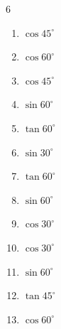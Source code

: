 \begin{multicols}{6}
\begin{enumerate}
  \item $\displaystyle \cos{45^\circ}$


  \item $\displaystyle \cos{60^\circ}$


  \item $\displaystyle \cos{45^\circ}$


  \item $\displaystyle \sin{60^\circ}$


  \item $\displaystyle \tan{60^\circ}$


  \item $\displaystyle \sin{30^\circ}$


  \item $\displaystyle \tan{60^\circ}$


  \item $\displaystyle \sin{60^\circ}$


  \item $\displaystyle \cos{30^\circ}$


\columnbreak %

  \item $\displaystyle \cos{30^\circ}$


  \item $\displaystyle \sin{60^\circ}$


  \item $\displaystyle \tan{45^\circ}$

        \phantom{$\displaystyle =1$}

  \item $\displaystyle \cos{60^\circ}$


\end{enumerate}
\end{multicols}
